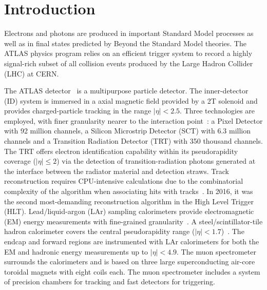 \section{Introduction}

Electrons and photons are produced in important Standard Model processes as well as in final states predicted by Beyond the Standard Model theories. 
The ATLAS physics program relies on an efficient trigger system to record a highly signal-rich subset of all collision events produced by the Large Hadron Collider (LHC) at CERN.

The ATLAS detector~\cite{PERF-2007-01} is a multipurpose particle detector. 
The inner-detector (ID) system is immersed in a axial magnetic field provided by a 2T solenoid and provides charged-particle tracking in the range $|\eta|<2.5$.  
Three technologies are employed, with finer granularity nearer to the interaction point~\cite{PERF-2015-08,CERN-LHCC-97-016,Haywood:331064}: a Pixel Detector with 92 million channels, a Silicon Microstrip Detector (SCT) with 6.3 million channels and a Transition Radiation Detector (TRT) with 350 thousand channels. 
The TRT offers electron identification capability within its pseudorapidity coverage ($|\eta|\leq 2$) via the detection of transition-radiation photons generated at the interface between the radiator material and detection straws. 
Track reconstruction requires CPU-intensive calculations due to the combinatorial complexity of the algorithm when associating hits with tracks~\cite{PERF-2015-08}. 
In 2016, it was the second most-demanding reconstruction algorithm in the High Level Trigger (HLT).
Lead/liquid-argon (LAr) sampling calorimeters provide electromagnetic (EM) energy measurements with fine-grained granularity~\cite{LARG-2009-01,larg_tdr}. 
A steel/scintillator-tile hadron calorimeter covers the central pseudorapidity range ($|\eta|< 1.7$)~\cite{TCAL-2017-01,tile_tdr}. 
The endcap and forward regions are instrumented with LAr calorimeters for both the EM and hadronic energy measurements up to $|\eta|< 4.9$. 
The muon spectrometer surrounds the calorimeters and is based on three large superconducting air-core toroidal magnets with eight coils each.  
The muon spectrometer includes a system of precision chambers for tracking and fast detectors for triggering. 

